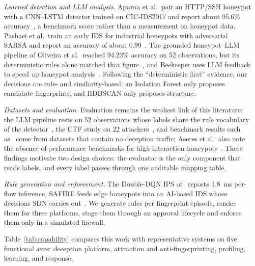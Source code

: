 \documentclass[conference]{IEEEtran}
\begin{document}
\textit{Learned detection and LLM analysis.} Aparna et al.\ pair an HTTP/SSH honeypot with a CNN--LSTM detector trained on CIC-IDS2017 and report about 95.6\% accuracy~\cite{aparna2026}, a benchmark score rather than a measurement on honeypot data. Pashaei et al.\ train an early IDS for industrial honeypots with adversarial SARSA and report an accuracy of about 0.99~\cite{pashaei2022}. The grounded honeypot--LLM pipeline of Oliveira et al.\ reached 94.23\% accuracy on 52 observations, but its deterministic rules alone matched that figure~\cite{oliveira2026}, and Beekeeper uses LLM feedback to speed up honeypot analysis~\cite{ilg2025}. Following the ``deterministic first'' evidence, our decisions are rule- and similarity-based; an Isolation Forest only proposes candidate fingerprints, and HDBSCAN only proposes structure.

\textit{Datasets and evaluation.} Evaluation remains the weakest link of this literature: the LLM pipeline rests on 52 observations whose labels share the rule vocabulary of the detector~\cite{oliveira2026}, the CTF study on 22 attackers~\cite{balogh2025}, and benchmark results such as~\cite{aparna2026,beltran2026} come from datasets that contain no deception traffic; Aseres et al.\ also note the absence of performance benchmarks for high-interaction honeypots~\cite{aseres2026}. These findings motivate two design choices: the evaluator is the only component that reads labels, and every label passes through one auditable mapping table.

\textit{Rule generation and enforcement.} The Double-DQN IPS of~\cite{mallik2026} reports 1.8~ms per-flow inference, SAFIRE feeds edge honeypots into an AI-based IDS whose decisions SDN carries out~\cite{slimani2026}. We generate rules per fingerprint episode, render them for three platforms, stage them through an approval lifecycle and enforce them only in a simulated firewall.

Table~\ref{tab:capability} compares this work with representative systems on five functional axes: deception platform, attraction and anti-fingerprinting, profiling, learning, and response.
\end{document}

